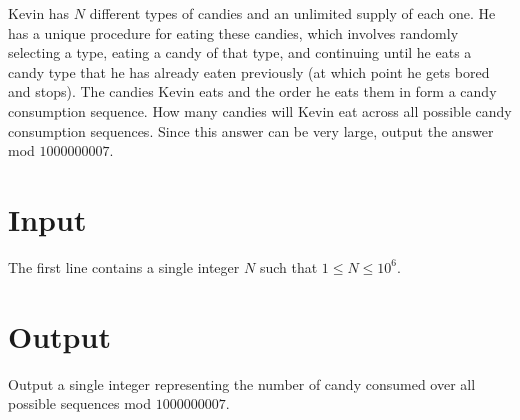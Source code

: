 
Kevin has $N$ different types of candies and an unlimited supply of each one. He has a unique procedure for
eating these candies, which involves randomly selecting a type, eating a candy of that type, and continuing
until he eats a candy type that he has already eaten previously (at which point he gets bored and stops).
The candies Kevin eats and the order he eats them in form a candy consumption sequence. How many candies will
Kevin eat across all possible candy consumption sequences. Since this answer can be very large, output the
answer mod $1000000007$.

\section*{Input}
The first line contains a single integer $N$ such that $1 \leq N \leq 10^6$.

\section*{Output}
Output a single integer representing the number of candy consumed over all possible sequences mod
$1000000007$.
